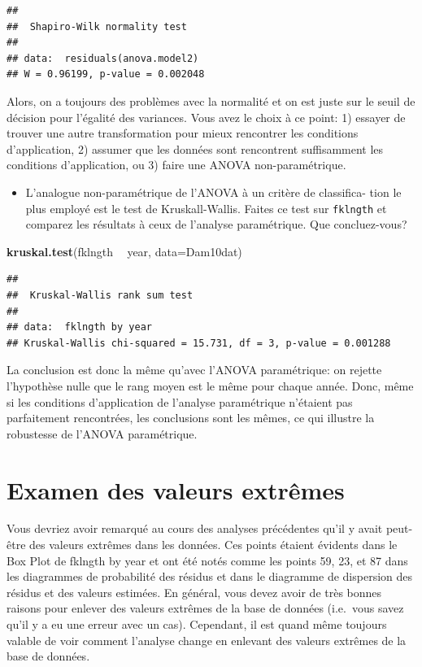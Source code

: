 \documentclass[12pt,]{book}
\newenvironment{Shaded}{\begin{snugshade}}{\end{snugshade}}
\newcommand{\DataTypeTok}[1]{\textcolor[rgb]{0.27,0.27,0.27}{#1}}
\newcommand{\KeywordTok}[1]{\textcolor[rgb]{0.27,0.27,0.27}{\textbf{#1}}}
\newcommand{\NormalTok}[1]{#1}
\newcommand{\OperatorTok}[1]{\textcolor[rgb]{0.43,0.43,0.43}{\textbf{#1}}}
\newcommand{\StringTok}[1]{\textcolor[rgb]{0.5,0.5,0.5}{#1}}
\providecommand{\tightlist}{%
  \setlength{\itemsep}{0pt}\setlength{\parskip}{0pt}}
\begin{document}
\begin{verbatim}
## 
## 	Shapiro-Wilk normality test
## 
## data:  residuals(anova.model2)
## W = 0.96199, p-value = 0.002048
\end{verbatim}

Alors, on a toujours des problèmes avec la normalité et on est juste sur le seuil de décision pour l'égalité des variances. Vous avez le choix à ce point: 1) essayer de trouver une autre transformation pour mieux rencontrer les conditions d'application, 2) assumer que les données sont rencontrent suffisamment les conditions d'application, ou 3) faire une ANOVA non-paramétrique.

\begin{itemize}
\tightlist
\item
  L'analogue non-paramétrique de l'ANOVA à un critère de classifica-
  tion le plus employé est le test de Kruskall-Wallis. Faites ce test sur \texttt{fklngth} et comparez les résultats à ceux de l'analyse paramétrique. Que concluez-vous?
\end{itemize}

\begin{Shaded}
\begin{Highlighting}[]
\KeywordTok{kruskal.test}\NormalTok{(fklngth }\OperatorTok{~}\StringTok{ }\NormalTok{year, }\DataTypeTok{data=}\NormalTok{Dam10dat)}
\end{Highlighting}
\end{Shaded}

\begin{verbatim}
## 
## 	Kruskal-Wallis rank sum test
## 
## data:  fklngth by year
## Kruskal-Wallis chi-squared = 15.731, df = 3, p-value = 0.001288
\end{verbatim}

La conclusion est donc la même qu'avec l'ANOVA paramétrique: on rejette l'hypothèse nulle que le rang moyen est le même pour chaque année. Donc, même si les conditions d'application de l'analyse paramétrique n'étaient pas parfaitement rencontrées, les conclusions sont les mêmes, ce qui illustre la robustesse de l'ANOVA paramétrique.

\hypertarget{examen-des-valeurs-extruxeames}{%
\section{Examen des valeurs extrêmes}\label{examen-des-valeurs-extruxeames}}

Vous devriez avoir remarqué au cours des analyses précédentes qu'il y avait peut-être des valeurs extrêmes dans les données. Ces points étaient évidents dans le Box Plot de fklngth by year et ont été notés comme les points 59, 23, et 87 dans les diagrammes de probabilité des résidus et dans le diagramme de dispersion des résidus et des valeurs estimées. En général, vous devez avoir de très bonnes raisons pour enlever des valeurs extrêmes de la base de données (i.e.~vous savez qu'il y a eu une erreur avec un cas). Cependant, il est quand même toujours valable de voir comment l'analyse change en enlevant des valeurs extrêmes de la base de données.
\end{document}
